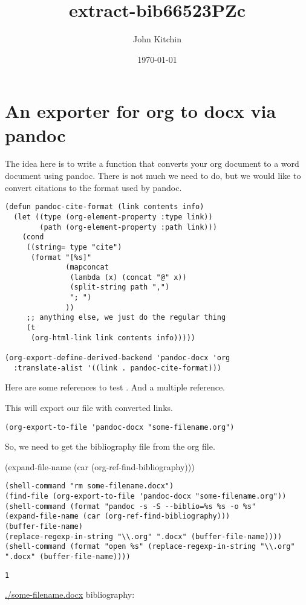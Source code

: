\documentclass[11pt]{article}
\author{John Kitchin}
\date{\today}
\title{extract-bib66523PZc}
\begin{document}
\tableofcontents

\section{An exporter for org to docx via pandoc}
\label{sec-1}

The idea here is to write a function that converts your org document to a word document using pandoc. There is not much we need to do, but we would like to convert citations to the format used by pandoc.

\begin{verbatim}
(defun pandoc-cite-format (link contents info)
  (let ((type (org-element-property :type link))
        (path (org-element-property :path link)))
    (cond
     ((string= type "cite")
      (format "[%s]"
              (mapconcat
               (lambda (x) (concat "@" x))
               (split-string path ",")
               "; ")
              ))
     ;; anything else, we just do the regular thing
     (t
      (org-html-link link contents info)))))

(org-export-define-derived-backend 'pandoc-docx 'org
  :translate-alist '((link . pandoc-cite-format)))
\end{verbatim}


Here are some references to test \cite{needs-1989-calcul}. And a multiple reference.

\cite{jarvi-2008-devel-reaxf,zhou-2004-first-lda-u,curnan-2014-effec-concen}

This will export our file with converted links.
\begin{verbatim}
(org-export-to-file 'pandoc-docx "some-filename.org")
\end{verbatim}

So, we need to get the bibliography file from the org file.

(expand-file-name (car (org-ref-find-bibliography)))

\begin{verbatim}
(shell-command "rm some-filename.docx")
(find-file (org-export-to-file 'pandoc-docx "some-filename.org"))
(shell-command (format "pandoc -s -S --biblio=%s %s -o %s"
(expand-file-name (car (org-ref-find-bibliography)))
(buffer-file-name)
(replace-regexp-in-string "\\.org" ".docx" (buffer-file-name))))
(shell-command (format "open %s" (replace-regexp-in-string "\\.org" ".docx" (buffer-file-name))))
\end{verbatim}

\begin{verbatim}
1
\end{verbatim}

\url{./some-filename.docx}
bibliography:
\end{document}
